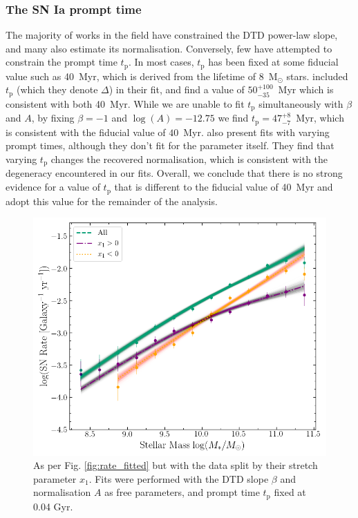 \documentclass[fleqn,usenatbib]{mnras}
\begin{document}
\subsubsection{The SN Ia prompt time \label{subsubsec:compare_tp}}

The majority of works in the field have constrained the DTD power-law slope, and many also estimate its normalisation. Conversely, few have attempted to constrain the prompt time $t_{\mathrm{p}}$. In most cases, $t_{\mathrm{p}}$ has been fixed at some fiducial value such as 40~Myr, which is derived from the lifetime of 8~M$_{\odot}$ stars. \citet{Castrillo2020} included $t_{\mathrm{p}}$ (which they denote $\Delta$) in their fit, and find a value of $50_{-35}^{+100}$~Myr which is consistent with both 40~Myr. While we are unable to fit $t_{\mathrm{p}}$ simultaneously with $\beta$ and $A$, by fixing $\beta=-1$ and $\log(A)=-12.75$ we find $t_{\mathrm{p}} =47_{-7}^{+8}$~Myr, which is consistent with the fiducial value of $40$~Myr. \citet{Heringer2019} also present fits with varying prompt times, although they don't fit for the parameter itself. They find that varying $t_{\mathrm{p}}$ changes the recovered normalisation, which is consistent with the degeneracy encountered in our fits. Overall, we conclude that there is no strong evidence for a value of $t_{\mathrm{p}}$ that is different to the fiducial value of 40~Myr and adopt this value for the remainder of the analysis.

\begin{figure}
    \centering
    \includegraphics[width=.5\textwidth]{figs/rate_vs_mass_DTD_fit_beta_norm_Qerf1.1_split_x1.png}
    \caption{As per Fig. \ref{fig:rate_fitted} but with the data split by their stretch parameter $x_1$. Fits were performed with the DTD slope $\beta$ and normalisation $A$ as free parameters, and prompt time $t_{\mathrm{p}}$ fixed at 0.04 Gyr.%
    \label{fig:rate_fitted_split_x1}}
\end{figure}
\end{document}
